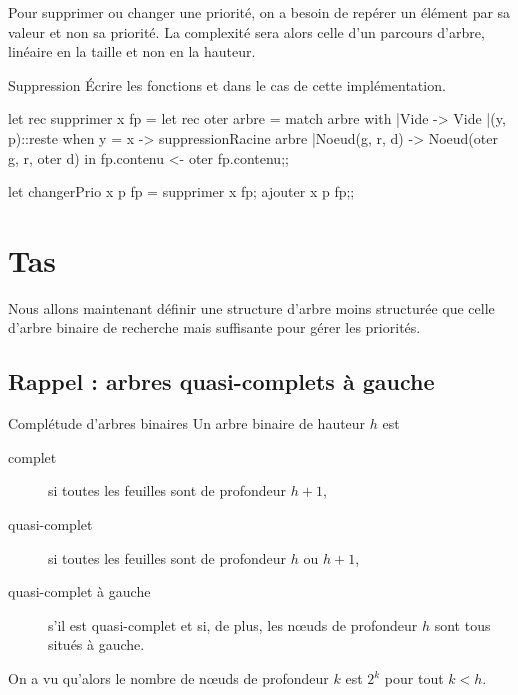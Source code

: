 Pour supprimer ou changer une priorité, on a besoin de repérer un élément par sa valeur et non sa priorité. La complexité sera alors celle d'un parcours d'arbre, linéaire en la taille et non en la hauteur.
\begin{exo}{Suppression}{}
Écrire les fonctions  et  dans le cas de cette implémentation.
\reponse
\begin{ocaml}
let rec supprimer x fp =
   let rec oter arbre =
      match arbre with
      |Vide -> Vide
      |(y, p)::reste when y = x ->  suppressionRacine  arbre
      |Noeud(g, r, d) -> Noeud(oter g, r, oter d) in
    fp.contenu <- oter fp.contenu;;

let changerPrio x p fp =
   supprimer x fp;
   ajouter x p fp;;
\end{ocaml}
\end{exo}
\newpage
\section{Tas}
Nous allons maintenant définir une structure d'arbre moins structurée que celle d'arbre binaire de recherche mais suffisante pour gérer les priorités.
\subsection{Rappel : arbres quasi-complets à gauche}
\begin{defin}{Complétude d'arbres binaires}{}
Un arbre binaire de hauteur $h$ est 
\begin{description}
\item[complet] si toutes les feuilles sont de profondeur $h+1$,
\item[quasi-complet] si toutes les feuilles sont de profondeur $h$ ou $h+1$,
\item[quasi-complet à gauche] s'il est quasi-complet et si, de plus, les nœuds de profondeur $h$ sont tous situés à gauche.
\end{description}
\end{defin}
On a vu qu'alors le nombre de nœuds de profondeur $k$ est $2^k$ pour tout $k<h$.

